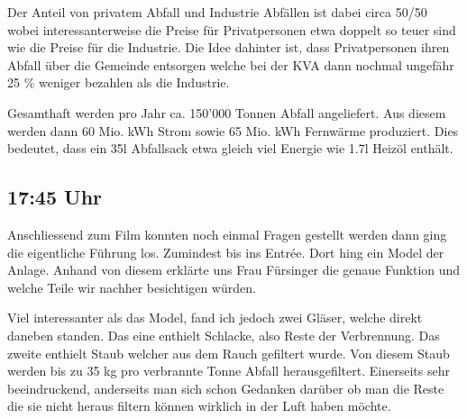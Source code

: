 Der Anteil von privatem Abfall und Industrie Abfällen ist dabei circa
50/50 wobei interessanterweise die Preise für Privatpersonen etwa
doppelt so teuer sind wie die Preise für die Industrie. Die Idee
dahinter ist, dass Privatpersonen ihren Abfall über die Gemeinde
entsorgen welche bei der KVA dann nochmal ungefähr 25 \% weniger
bezahlen als die Industrie.

Gesamthaft werden pro Jahr ca. 150'000 Tonnen Abfall angeliefert. Aus
diesem werden dann 60 Mio. kWh Strom sowie 65 Mio. kWh Fernwärme
produziert. Dies bedeutet, dass ein 35l Abfallsack etwa gleich viel
Energie wie 1.7l Heizöl enthält.

\subsection{17:45 Uhr}
\label{sec-2-4}
Anschliessend zum Film konnten noch einmal Fragen gestellt werden dann
ging die eigentliche Führung los. Zumindest bis ins Entrée. Dort hing
ein Model der Anlage. Anhand von diesem erklärte uns Frau Fürsinger
die genaue Funktion und welche Teile wir nachher besichtigen würden.

\begin{center}
\end{center}

Viel interessanter als das Model, fand ich jedoch zwei Gläser, welche
direkt daneben standen. Das eine enthielt Schlacke, also Reste der
Verbrennung. Das zweite enthielt Staub welcher aus dem Rauch gefiltert
wurde. Von diesem Staub werden bis zu 35 kg pro verbrannte Tonne Abfall
herausgefiltert. Einerseits sehr beeindruckend, anderseits man sich
schon Gedanken darüber ob man die Reste die sie nicht heraus filtern
können wirklich in der Luft haben möchte.

